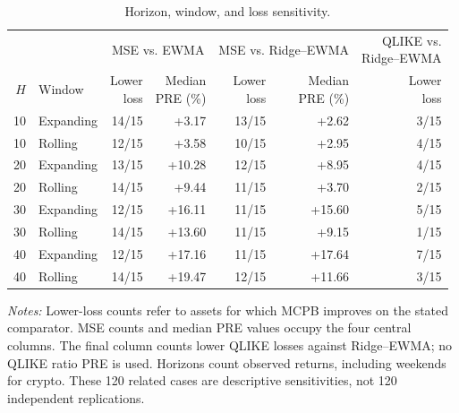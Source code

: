 \begin{table}[tbp]
\centering\small
\setlength{\tabcolsep}{4pt}
\renewcommand{\arraystretch}{1.12}
\caption{Horizon, window, and loss sensitivity.}
\label{tab:robustness}
\begin{tabular}{rlrrrrr}
\toprule
 & & \multicolumn{2}{c}{MSE vs. EWMA} & \multicolumn{2}{c}{MSE vs. Ridge--EWMA} & \shortstack{QLIKE vs.\\Ridge--EWMA} \\
\cmidrule(lr){3-4}\cmidrule(lr){5-6}\cmidrule(lr){7-7}
$H$ & Window & \shortstack{Lower\\loss} & \shortstack{Median\\PRE (\%)} & \shortstack{Lower\\loss} & \shortstack{Median\\PRE (\%)} & \shortstack{Lower\\loss} \\
\midrule
10 & Expanding & 14/15 & +3.17 & 13/15 & +2.62 & 3/15 \\
10 & Rolling & 12/15 & +3.58 & 10/15 & +2.95 & 4/15 \\
20 & Expanding & 13/15 & +10.28 & 12/15 & +8.95 & 4/15 \\
20 & Rolling & 14/15 & +9.44 & 11/15 & +3.70 & 2/15 \\
30 & Expanding & 12/15 & +16.11 & 11/15 & +15.60 & 5/15 \\
30 & Rolling & 14/15 & +13.60 & 11/15 & +9.15 & 1/15 \\
40 & Expanding & 12/15 & +17.16 & 11/15 & +17.64 & 7/15 \\
40 & Rolling & 14/15 & +19.47 & 12/15 & +11.66 & 3/15 \\
\bottomrule
\end{tabular}
\par\smallskip
\begin{minipage}{0.98\linewidth}\footnotesize
\textit{Notes:} Lower-loss counts refer to assets for which MCPB improves on the stated comparator. MSE counts and median PRE values occupy the four central columns. The final column counts lower QLIKE losses against Ridge--EWMA; no QLIKE ratio PRE is used. Horizons count observed returns, including weekends for crypto. These 120 related cases are descriptive sensitivities, not 120 independent replications.
\end{minipage}
\end{table}
